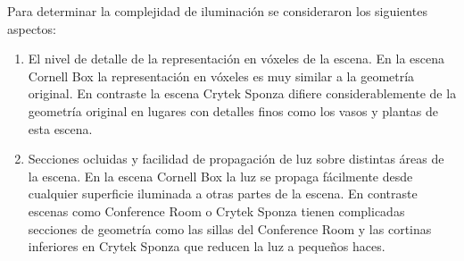 Para determinar la complejidad de iluminación se consideraron los siguientes aspectos:

\begin{enumerate}
	\item El nivel de detalle de la representación en vóxeles de la escena. En la escena Cornell Box la representación en vóxeles es muy similar a la geometría original. En contraste la escena Crytek Sponza difiere considerablemente de la geometría original en lugares con detalles finos como los vasos y plantas de esta escena.
	\item Secciones ocluidas y facilidad de propagación de luz sobre distintas áreas de la escena. En la escena Cornell Box la luz se propaga fácilmente desde cualquier superficie iluminada a otras partes de la escena. En contraste escenas como Conference Room o Crytek Sponza tienen complicadas secciones de geometría como las sillas del Conference Room y las cortinas inferiores en Crytek Sponza que reducen la luz a pequeños haces.
\end{enumerate}
